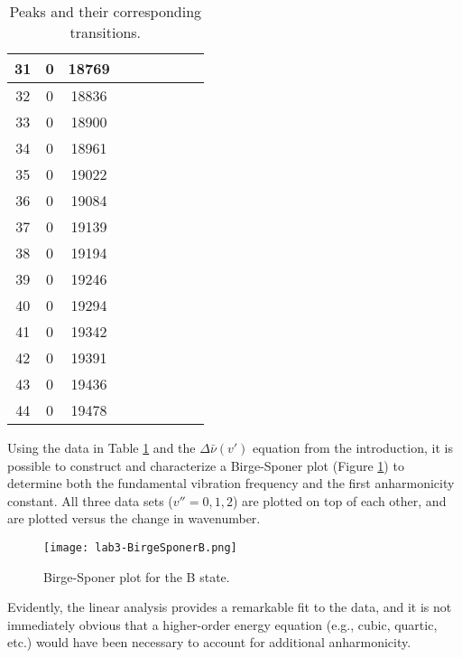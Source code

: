 \documentclass[../labs.tex]{subfiles}
\begin{document}
\begin{table}[H]
\begin{tabular}{|c|c|c|c|c|c|c|c|c|}
        31 & 0 & 18769 &    &   &       &    &   &      \\ \hline
        32 & 0 & 18836 &    &   &       &    &   &      \\ \hline
        33 & 0 & 18900 &    &   &       &    &   &      \\ \hline
        34 & 0 & 18961 &    &   &       &    &   &      \\ \hline
        35 & 0 & 19022 &    &   &       &    &   &      \\ \hline
        36 & 0 & 19084 &    &   &       &    &   &      \\ \hline
        37 & 0 & 19139 &    &   &       &    &   &      \\ \hline
        38 & 0 & 19194 &    &   &       &    &   &      \\ \hline
        39 & 0 & 19246 &    &   &       &    &   &      \\ \hline
        40 & 0 & 19294 &    &   &       &    &   &      \\ \hline
        41 & 0 & 19342 &    &   &       &    &   &      \\ \hline
        42 & 0 & 19391 &    &   &       &    &   &      \\ \hline
        43 & 0 & 19436 &    &   &       &    &   &      \\ \hline
        44 & 0 & 19478 &    &   &       &    &   &      \\ \hline
    \end{tabular}
    \caption{Peaks and their corresponding transitions.}
    \label{tab:peakTransition3}
\end{table}
Using the data in Table \ref{tab:peakTransition3} and the $\Delta\bar{\nu}(v')$ equation from the introduction, it is possible to construct and characterize a Birge-Sponer plot (Figure \ref{fig:BirgeSponerB3}) to determine both the fundamental vibration frequency and the first anharmonicity constant. All three data sets ($v''=0,1,2$) are plotted on top of each other, and are plotted versus the change in wavenumber.
\begin{figure}[H]
    \centering
    \texttt{[image: lab3-BirgeSponerB.png]}
    \caption{Birge-Sponer plot for the B state.}
    \label{fig:BirgeSponerB3}
\end{figure}
Evidently, the linear analysis provides a remarkable fit to the data, and it is not immediately obvious that a higher-order energy equation (e.g., cubic, quartic, etc.) would have been necessary to account for additional anharmonicity.\par
\end{document}
